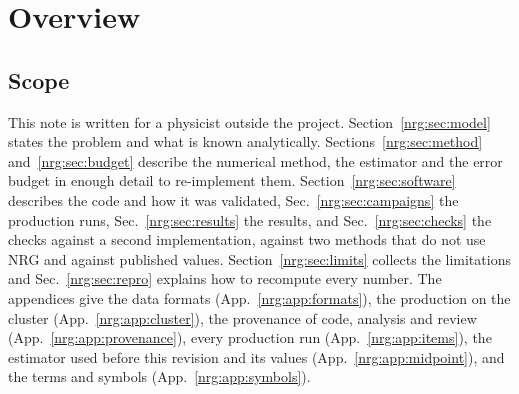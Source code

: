 \begin{abstract}
error at $\nrgmcAccWithinLin$ points, and $\nrgmcAccRatioMax$ times that sum at the fifth; but it is up to $\nrgmcAccStatRatioMax$
Monte Carlo statistical errors, with the same sign at neighboring points, so only the fit-model half-range reconciles the two. The
Monte Carlo crossing extrapolations agree with NRG within $\nrgmcCrossStatMax$ of their statistical errors at these points. A second
solver, written by a separate Claude agent from a physics-only specification, reproduces the chain coefficients to better than
$\nrgindChain$ (rounding level), the critical couplings bitwise or to $\nrgindAlpha$, and $\DE$ to $\nrgindDE$ in every window its
finite differences can reach. The code was written by GPT-6 astra (OpenAI) and ported to the cluster, run and analyzed by Claude Code
(Anthropic); every number in this note is regenerated from the released records by .
\end{abstract}


\clearpage

\section{Overview}\label{nrg:sec:overview}
\subsection{Scope}
This note is written for a physicist outside the project. Section~\ref{nrg:sec:model} states the problem and what is known analytically.
Sections~\ref{nrg:sec:method} and~\ref{nrg:sec:budget} describe the numerical method, the estimator and the error budget in enough detail to
re-implement them. Section~\ref{nrg:sec:software} describes the code and how it was validated, Sec.~\ref{nrg:sec:campaigns} the production
runs, Sec.~\ref{nrg:sec:results} the results, and Sec.~\ref{nrg:sec:checks} the checks against a second implementation, against two methods
that do not use NRG and against published values. Section~\ref{nrg:sec:limits} collects the limitations and Sec.~\ref{nrg:sec:repro}
explains how to recompute every number. The appendices give the data formats (App.~\ref{nrg:app:formats}), the production on the
cluster (App.~\ref{nrg:app:cluster}), the provenance of code, analysis and review (App.~\ref{nrg:app:provenance}), every production run
(App.~\ref{nrg:app:items}), the estimator used before this revision and its values (App.~\ref{nrg:app:midpoint}), and the terms and symbols
(App.~\ref{nrg:app:symbols}).

